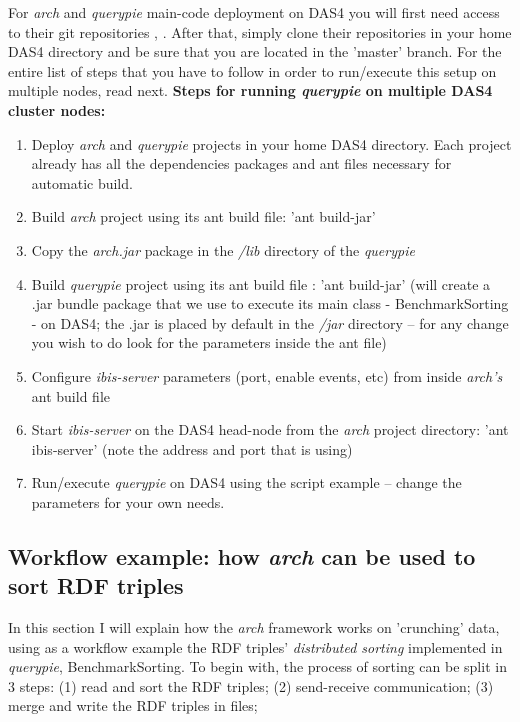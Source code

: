 For \textit{arch} and \textit{querypie} main-code deployment on DAS4 you will first need access to their git repositories \cite{arch_repo}, \cite{qpie_repo}. After that, simply clone their repositories in your home DAS4 directory and be sure that you are located in the 'master' branch. For the entire list of steps that you have to follow in order to run/execute this setup on multiple nodes, read next.
\newline
\newline
\textbf{Steps for running \textit{querypie} on multiple DAS4 cluster nodes:}
\begin{enumerate}
	\item Deploy \textit{arch} and \textit{querypie} projects in your home DAS4 directory. Each project already has all the dependencies packages and ant files necessary for automatic build. 
	\item Build \textit{arch} project using its ant build file: 'ant build-jar' 
	\item Copy the \textit{arch.jar} package in the \textit{/lib} directory of the \textit{querypie}
	\item Build \textit{querypie} project using its ant build file \cite{build_file}: 'ant build-jar' (will create a .jar bundle package that we use to execute its main class - BenchmarkSorting - on DAS4; the .jar is placed by default in the \textit{/jar} directory -- for any change you wish to do look for the parameters inside the ant file)
	\item Configure \textit{ibis-server} parameters (port, enable events, etc) from inside \textit{arch's} ant build file 
	\item Start \textit{ibis-server} on the DAS4 head-node from the \textit{arch} project directory: 'ant ibis-server' (note the address and port that is using)
	\item Run/execute \textit{querypie} on DAS4 using the script example \cite{run_on_das4} -- change the parameters for your own needs.
\end{enumerate}

% 
\subsection{Workflow example: how \textit{arch} can be used to sort RDF triples}

In this section I will explain how the \textit{arch} framework works on 'crunching' data, using as a workflow example the RDF triples' \textit{distributed sorting} implemented in \textit{querypie}, BenchmarkSorting. To begin with, the process of sorting can be split in 3 steps: (1) read and sort the RDF triples; (2) send-receive communication; (3) merge and write the RDF triples in files;

